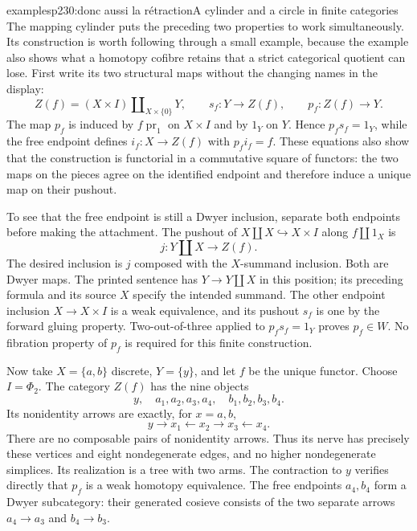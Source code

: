 \begin{dcomment}{examples}{p230:donc aussi la rétraction}{A cylinder and a circle in finite categories}
The mapping cylinder puts the preceding two properties to work simultaneously. Its construction is worth following through a small example, because the example also shows what a homotopy cofibre retains that a strict categorical quotient can lose. First write its two structural maps without the changing names in the display:
\[
 Z(f)=(X\times I)\amalg_{X\times\{0\}}Y,
 \qquad s_f:Y\longrightarrow Z(f),
 \qquad p_f:Z(f)\longrightarrow Y.
\]
The map $p_f$ is induced by $f\operatorname{pr}_1$ on $X\times I$ and by $1_Y$ on $Y$. Hence $p_fs_f=1_Y$, while the free endpoint defines $i_f:X\to Z(f)$ with $p_fi_f=f$. These equations also show that the construction is functorial in a commutative square of functors: the two maps on the pieces agree on the identified endpoint and therefore induce a unique map on their pushout.

To see that the free endpoint is still a Dwyer inclusion, separate both endpoints before making the attachment. The pushout of $X\amalg X\hookrightarrow X\times I$ along $f\amalg1_X$ is
\[
 j:Y\amalg X\longrightarrow Z(f).
\]
The desired inclusion is $j$ composed with the $X$-summand inclusion. Both are Dwyer maps. The printed sentence has $Y\to Y\amalg X$ in this position; its preceding formula and its source $X$ specify the intended summand. The other endpoint inclusion $X\to X\times I$ is a weak equivalence, and its pushout $s_f$ is one by the forward gluing property. Two-out-of-three applied to $p_fs_f=1_Y$ proves $p_f\in W$. No fibration property of $p_f$ is required for this finite construction.

Now take $X=\{a,b\}$ discrete, $Y=\{y\}$, and let $f$ be the unique functor. Choose $I=\Phi_2$. The category $Z(f)$ has the nine objects
\[
 y,\quad a_1,a_2,a_3,a_4,\quad b_1,b_2,b_3,b_4.
\]
Its nonidentity arrows are exactly, for $x=a,b$,
\[
 y\longrightarrow x_1\longleftarrow x_2
       \longrightarrow x_3\longleftarrow x_4.
\]
There are no composable pairs of nonidentity arrows. Thus its nerve has precisely these vertices and eight nondegenerate edges, and no higher nondegenerate simplices. Its realization is a tree with two arms. The contraction to $y$ verifies directly that $p_f$ is a weak homotopy equivalence. The free endpoints $a_4,b_4$ form a Dwyer subcategory: their generated cosieve consists of the two separate arrows $a_4\to a_3$ and $b_4\to b_3$.


\end{dcomment}
